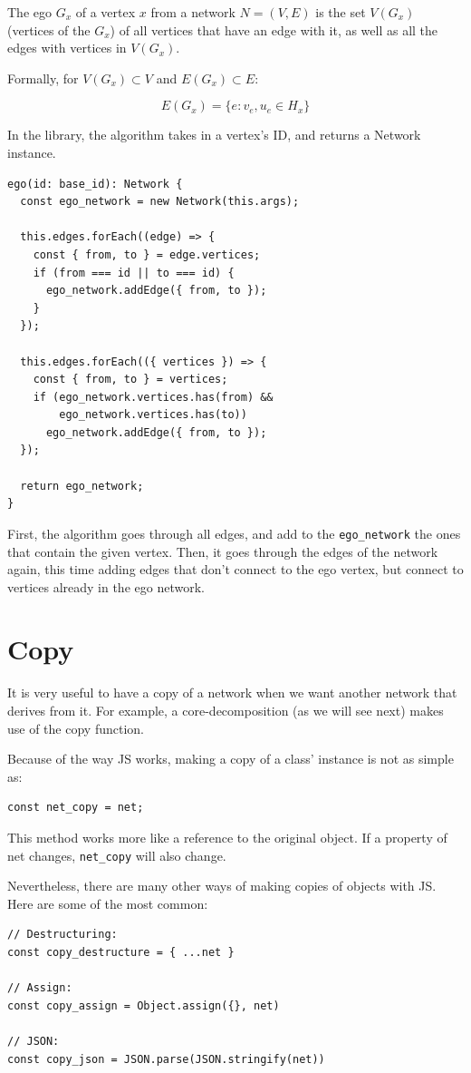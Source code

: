 The ego $G_x$ of a vertex $x$ from a network $N=(V,E)$ is the set $V(G_x)$ (vertices of the $G_x$)
of all vertices that have an edge with it, as well as all the edges with vertices in $V(G_x)$.

Formally, for
$V(G_x) \subset V$ and $E(G_x) \subset E$:

$$E(G_x)=\{e : v_e,u_e \in H_x\}$$

In the library, the algorithm takes in a vertex's ID, and returns a Network instance.
\begin{verbatim}
ego(id: base_id): Network {
  const ego_network = new Network(this.args);

  this.edges.forEach((edge) => {
    const { from, to } = edge.vertices;
    if (from === id || to === id) {
      ego_network.addEdge({ from, to });
    }
  });

  this.edges.forEach(({ vertices }) => {
    const { from, to } = vertices;
    if (ego_network.vertices.has(from) &&
        ego_network.vertices.has(to))
      ego_network.addEdge({ from, to });
  });

  return ego_network;
}
\end{verbatim}

First, the algorithm goes through all edges, and add to the \texttt{ego_network}
the ones that contain the given vertex.
Then, it goes through the edges of the network again,
this time adding edges that don't connect to the ego vertex,
but connect to vertices already in the ego network.

\section{Copy}

It is very useful to have a copy of a network
when we want another network that derives from it.
For example, a core-decomposition (as we will see next)
makes use of the copy function.

Because of the way JS works, making a copy of a class' instance
is not as simple as:
\begin{verbatim}
const net_copy = net;
\end{verbatim}

This method works more like a reference to the original object.
If a property of net changes, \texttt{net_copy} will also change.

Nevertheless, there are many other ways of making copies of objects with JS.
Here are some of the most common:
\begin{verbatim}
// Destructuring:
const copy_destructure = { ...net }

// Assign:
const copy_assign = Object.assign({}, net)

// JSON:
const copy_json = JSON.parse(JSON.stringify(net))
\end{verbatim}

